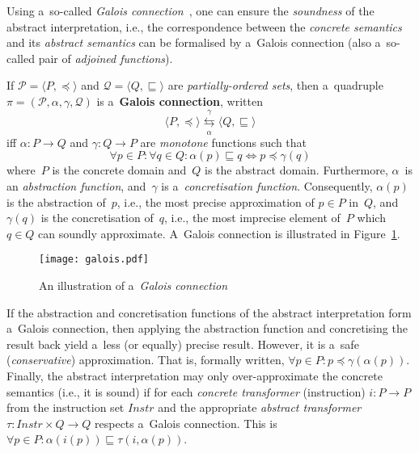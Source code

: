 Using a~so-called \emph{Galois connection}~\cite{AILatticeModelCousot, wideningNarrowingCousot, savAI, staticAnalysisMoller, programAnalysisNielson, staticAnalysisRival}, one can ensure the \emph{soundness} of the abstract interpretation, i.e., the correspondence between the \emph{concrete semantics} and its \emph{abstract semantics} can be formalised by a~Galois connection (also a~so-called pair of \emph{adjoined functions}).
\begin{definition}
    If $ \mathcal{P} = \langle P, \preceq \rangle $ and $ \mathcal{Q} = \langle Q, \sqsubseteq \rangle $ are \emph{partially-ordered sets}, then a~quadruple $ \pi = (\mathcal{P}, \alpha, \gamma, \mathcal{Q}) $ is a~\textbf{Galois connection}, written
    $$
        \langle P, \preceq \rangle \overset{\gamma}{\underset{\alpha}\leftrightarrows} \langle Q, \sqsubseteq \rangle
    $$
    iff $ \alpha : P \rightarrow Q $ and $ \gamma : Q \rightarrow P $ are \emph{monotone} functions such that
    $$
        \forall p \in P : \forall q \in Q : \alpha(p) \sqsubseteq q \Longleftrightarrow p \preceq \gamma(q)
    $$
    where~$ P $ is the concrete domain and~$ Q $ is the abstract domain. Furthermore, $ \alpha $~is an \emph{abstraction function}, and~$ \gamma $ is a~\emph{concretisation function}. Consequently, $ \alpha(p) $ is the abstraction of~$ p $, i.e., the most precise approximation of $ p \in P $ in~$ Q $, and $ \gamma(q) $ is the concretisation of~$ q $, i.e., the most imprecise element of~$ P $ which $ q \in Q $ can soundly approximate. A~Galois connection is illustrated in Figure~\ref{fig:galois}.
\end{definition}

\begin{figure}[hbt]
    \centering
    \texttt{[image: galois.pdf]}
    \caption{An illustration of a~\emph{Galois connection}}
    \label{fig:galois}
\end{figure}

If the abstraction and concretisation functions of the abstract interpretation form a~Galois connection, then applying the abstraction function and concretising the result back yield a~less (or equally) precise result. However, it is a~safe (\emph{conservative}) approximation. That is, formally written, $ \forall p \in P : p \preceq \gamma(\alpha(p)) $. Finally, the abstract interpretation may only over-approximate the concrete semantics (i.e., it is sound) if for each \emph{concrete transformer} (instruction) $ i : P \rightarrow P $ from the instruction set $ Instr $ and the appropriate \emph{abstract transformer} $ \tau : Instr \times Q \rightarrow Q $ respects a~Galois connection. This is $ \forall p \in P : \alpha(i(p)) \sqsubseteq \tau(i, \alpha(p)) $.


